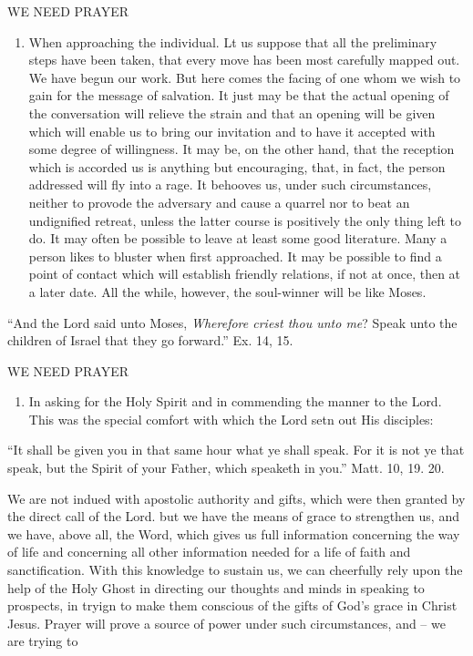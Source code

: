 \documentclass[
]{book}
\providecommand{\tightlist}{%
  \setlength{\itemsep}{0pt}\setlength{\parskip}{0pt}}
\begin{document}
WE NEED PRAYER

\begin{enumerate}
\def\labelenumi{\alph{enumi}.}
\setcounter{enumi}{3}
\tightlist
\item
  When approaching the individual. Lt us suppose that all the preliminary steps have been taken, that every move has been most carefully mapped out. We have begun our work. But here comes the facing of one whom we wish to gain for the message of salvation. It just may be that the actual opening of the conversation will relieve the strain and that an opening will be given which will enable us to bring our invitation and to have it accepted with some degree of willingness. It may be, on the other hand, that the reception which is accorded us is anything but encouraging, that, in fact, the person addressed will fly into a rage. It behooves us, under such circumstances, neither to provode the adversary and cause a quarrel nor to beat an undignified retreat, unless the latter course is positively the only thing left to do. It may often be possible to leave at least some good literature. Many a person likes to bluster when first approached. It may be possible to find a point of contact which will establish friendly relations, if not at once, then at a later date. All the while, however, the soul-winner will be like Moses.
\end{enumerate}

``And the Lord said unto Moses, \emph{Wherefore criest thou unto me}? Speak unto the children of Israel that they go forward.'' Ex. 14, 15.

WE NEED PRAYER

\begin{enumerate}
\def\labelenumi{\alph{enumi}.}
\setcounter{enumi}{4}
\tightlist
\item
  In asking for the Holy Spirit and in commending the manner to the Lord. This was the special comfort with which the Lord setn out His disciples:
\end{enumerate}

``It shall be given you in that same hour what ye shall speak. For it is not ye that speak, but the Spirit of your Father, which speaketh in you.'' Matt. 10, 19. 20.

We are not indued with apostolic authority and gifts, which were then granted by the direct call of the Lord. but we have the means of grace to strengthen us, and we have, above all, the Word, which gives us full information concerning the way of life and concerning all other information needed for a life of faith and sanctification. With this knowledge to sustain us, we can cheerfully rely upon the help of the Holy Ghost in directing our thoughts and minds in speaking to prospects, in tryign to make them conscious of the gifts of God's grace in Christ Jesus. Prayer will prove a source of power under such circumstances, and -- we are trying to
\end{document}
